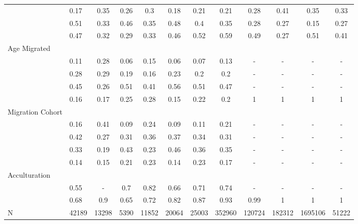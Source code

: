 \begin{table}[ht]
\begin{tabular}{>{\raggedright\arraybackslash}p{3.2cm}|lcccccc|cccc}
  \multicolumn{1}{>{\raggedleft\arraybackslash}p{2.2cm}|}{\makebox[2.2cm][r]{Lives Alone }}& 0.17 & 0.35 & 0.26 & 0.3 & 0.18 & 0.21 & 0.21 & 0.28 & 0.41 & 0.35 & 0.33 \\ 
  \multicolumn{1}{>{\raggedleft\arraybackslash}p{2.9cm}|}{\makebox[2.9cm][r]{Lives with Child }}& 0.51 & 0.33 & 0.46 & 0.35 & 0.48 & 0.4 & 0.35 & 0.28 & 0.27 & 0.15 & 0.27 \\ 
  \multicolumn{1}{>{\raggedleft\arraybackslash}p{3.4cm}|}{\makebox[3.4cm][r]{Married/Cohabiting }}& 0.47 & 0.32 & 0.29 & 0.33 & 0.46 & 0.52 & 0.59 & 0.49 & 0.27 & 0.51 & 0.41 \\ 
  Age Migrated &  &  &  &  &  &  &  &  &  &  &  \\ 
  \multicolumn{1}{>{\raggedleft\arraybackslash}p{2.4cm}|}{\makebox[2.4cm][r]{Less than 15 }}& 0.11 & 0.28 & 0.06 & 0.15 & 0.06 & 0.07 & 0.13 & - & - & - & - \\ 
  \multicolumn{1}{>{\raggedleft\arraybackslash}p{1.6cm}|}{\makebox[1.6cm][r]{15 - 23 }}& 0.28 & 0.29 & 0.19 & 0.16 & 0.23 & 0.2 & 0.2 & - & - & - & - \\ 
  \multicolumn{1}{>{\raggedleft\arraybackslash}p{1.6cm}|}{\makebox[1.6cm][r]{24 - 49 }}& 0.45 & 0.26 & 0.51 & 0.41 & 0.56 & 0.51 & 0.47 & - & - & - & - \\ 
  \multicolumn{1}{>{\raggedleft\arraybackslash}p{2.6cm}|}{\makebox[2.6cm][r]{50 and Above }}& 0.16 & 0.17 & 0.25 & 0.28 & 0.15 & 0.22 & 0.2 & 1 & 1 & 1 & 1 \\ 
  Migration Cohort &  &  &  &  &  &  &  &  &  &  &  \\ 
  \multicolumn{1}{>{\raggedleft\arraybackslash}p{2.3cm}|}{\makebox[2.3cm][r]{Before 1965 }}& 0.16 & 0.41 & 0.09 & 0.24 & 0.09 & 0.11 & 0.21 & - & - & - & - \\ 
  \multicolumn{1}{>{\raggedleft\arraybackslash}p{2.2cm}|}{\makebox[2.2cm][r]{1965 - 1979 }}& 0.42 & 0.27 & 0.31 & 0.36 & 0.37 & 0.34 & 0.31 & - & - & - & - \\ 
  \multicolumn{1}{>{\raggedleft\arraybackslash}p{2.2cm}|}{\makebox[2.2cm][r]{1980 - 1999 }}& 0.33 & 0.19 & 0.43 & 0.23 & 0.46 & 0.36 & 0.35 & - & - & - & - \\ 
  \multicolumn{1}{>{\raggedleft\arraybackslash}p{2.1cm}|}{\makebox[2.1cm][r]{After 1999 }}& 0.14 & 0.15 & 0.21 & 0.23 & 0.14 & 0.23 & 0.17 & - & - & - & - \\ 
  Acculturation &  &  &  &  &  &  &  &  &  &  &  \\ 
  \multicolumn{1}{>{\raggedleft\arraybackslash}p{1.6cm}|}{\makebox[1.6cm][r]{Citizen }}& 0.55 & - & 0.7 & 0.82 & 0.66 & 0.71 & 0.74 & - & - & - & - \\ 
  \multicolumn{1}{>{\raggedleft\arraybackslash}p{3cm}|}{\makebox[3cm][r]{English Speakers }}& 0.68 & 0.9 & 0.65 & 0.72 & 0.82 & 0.87 & 0.93 & 0.99 & 1 & 1 & 1 \\ 
  N & 42189 & 13298 & 5390 & 11852 & 20064 & 25003 & 352960 & 120724 & 182312 & 1695106 & 51222 \\ 
   \hline
\end{tabular}
\endgroup
\end{table}
